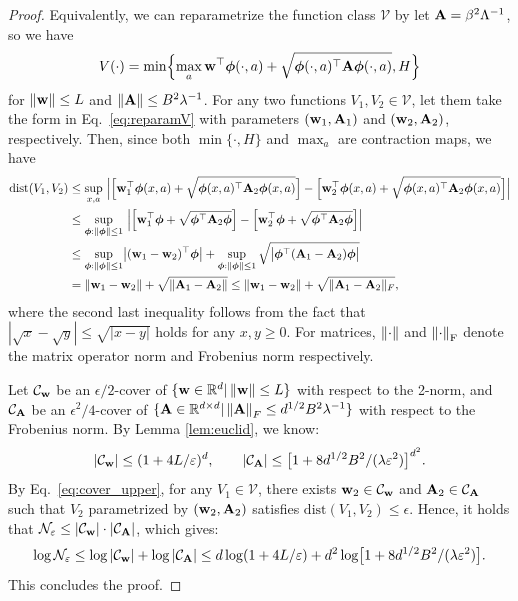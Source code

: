 \begin{proof}
Equivalently, we can reparametrize the function class $\mathcal{V}$ by let $\mathbf{A} = \beta^2 \Lambda^{-1}$, so we have
\begin{align}\label{eq:reparamV}
V (\cdot) = \min \Bigl \{\max_a \mathbf{w}^{\top}\bm{\phi}(\cdot, a) + \sqrt{\bm{\phi}(\cdot, a) ^{\top} \mathbf{A} \bm{\phi}(\cdot, a)}, H\Bigr \}
\end{align}
for $\left\|{\mathbf{w}}\right\| \le L$ and $\left\|{\mathbf{A}}\right\| \le B^2 \lambda^{-1}$.  
For any two functions $V_1, V_2 \in \mathcal{V}$, let them take the form in Eq.~\eqref{eq:reparamV} with parameters $(\mathbf{w}_1, \mathbf{A}_1)$ and $(\mathbf{w}_2, \mathbf{A}_2)$, respectively. 
Then, since both $\min\{\cdot, H\}$ and $\max_a$ are contraction maps, 
we have 
\begin{align} \label{eq:cover_upper}
\mathrm{dist}(V_1, V_2)  & \le \sup_{x, a} ~\Bigl | \Bigl[  \mathbf{w}_1^{\top}\bm{\phi}(x, a) + \sqrt{\bm{\phi}(x, a) ^{\top} \mathbf{A}_2 \bm{\phi}(x, a)  } \Bigr ] -  \Bigl[ \mathbf{w}_2^{\top}\bm{\phi}(x, a) + \sqrt{\bm{\phi}(x, a) ^{\top} \mathbf{A}_2 \bm{\phi}(x, a)  } \Bigr ] \Bigr |  \notag \\
&\le  \sup_{\bm{\phi}:\left\|{\bm{\phi}}\right\|\le 1} ~\Bigl | \Bigl[  \mathbf{w}_1^{\top}\bm{\phi} + \sqrt{\bm{\phi} ^{\top} \mathbf{A}_2 \bm{\phi}  } \Bigr ] -  \Bigl[ \mathbf{w}_2^{\top}\bm{\phi} +  \sqrt{\bm{\phi} ^{\top} \mathbf{A}_2 \bm{\phi}  } \Bigr ] \Bigr |  \notag \\
& \leq \sup_{\bm{\phi}:\left\|{\bm{\phi}}\right\|\le 1}   \bigl | (\mathbf{w}_1 - \mathbf{w}_2) ^{\top} \bm{\phi} \bigr | +  \sup_{\bm{\phi}:\left\|{\bm{\phi}}\right\|\le 1} \sqrt{  \bigl|  \bm{\phi}^{\top} (\mathbf{A}_1 -\mathbf{A}_2) \bm{\phi}    \bigr |  } \notag \\
& = \| \mathbf{w}_1 - \mathbf{w}_2 \| + \sqrt{\| \mathbf{A}_1 - \mathbf{A}_2 \|} \le \| \mathbf{w}_1 - \mathbf{w}_2 \| + \sqrt{\| \mathbf{A}_1 - \mathbf{A}_2 \|_F}, 
\end{align}
where the second last inequality follows from the fact that $| \sqrt{ x} - \sqrt{y} |  \leq \sqrt{ | x- y|}$ holds for any $x, y \geq 0$.
For matrices, $\left\|{\cdot}\right\|$ and $\left\|{\cdot}\right\|_{\text{F}}$ denote the matrix operator norm and Frobenius norm respectively.

Let $\mathcal{C}_{\mathbf{w}}$ be an $\epsilon/2$-cover of $\{\mathbf{w}\in\mathbb{R}^d | \left\|{\mathbf{w}}\right\| \le L\}$ with respect to the 2-norm, and $\mathcal{C}_{\mathbf{A}}$ be an $\epsilon^2/4$-cover of $\{\mathbf{A} \in \mathbb{R}^{d\times d} | \left\|{\mathbf{A}}\right\|_F \le d^{1/2}B^2\lambda^{-1}\}$ with respect to the Frobenius norm. By Lemma \ref{lem:euclid}, we know:
\begin{equation*}
| \mathcal{C}_{\mathbf{w}} | \leq ( 1+ 4L / \varepsilon ) ^d , \qquad  | \mathcal{C}_{\mathbf{A}} | \leq \bigl [ 1 +  8 d^{1/2} B^2 / (\lambda\varepsilon^2)  \bigr ] ^{d^2}.
\end{equation*}
By Eq.~\eqref{eq:cover_upper}, for any $V_1 \in \mathcal{V}$, there exists $\mathbf{w}_2 \in \mathcal{C}_{\mathbf{w}}$ and $\mathbf{A}_2 \in  \mathcal{C}_{\mathbf{A}}$ such that $V_2$ parametrized by $(\mathbf{w}_2, \mathbf{A}_2)$ satisfies $\mathrm{dist}(V_1, V_2)  \leq \epsilon$. Hence, it holds that $\mathcal{N}_{\varepsilon} \leq | \mathcal{C}_{\mathbf{w}} | \cdot | \mathcal{C}_{\mathbf{A}} |$, which gives:
$$
\log \mathcal{N}_{\varepsilon}  \leq \log  | \mathcal{C}_{\mathbf{w}} |  +  \log | \mathcal{C}_{\mathbf{A}} |  \leq d  \log (1+ 4L / \varepsilon ) + d^2 \log \bigl [  1 +  8 d^{1/2} B^2  / (\lambda\varepsilon^2)  \bigr ].
$$
This concludes the proof.
\end{proof}

